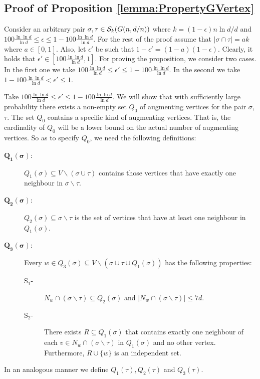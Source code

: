 \documentclass[a4paper,10pt]{article}
\begin{document}
\subsection{Proof of Proposition \ref{lemma:PropertyGVertex}}\label{sec:PropoGVertex}

Consider  an arbitrary pair $\sigma, \tau \in {\cal S}_k(G(n,d/n))$
where $k=(1-\epsilon)n\ln d/d$ and $100\frac{\ln\ln d}{\ln d}\leq \epsilon
\leq 1-100\frac{\ln\ln d}{\ln d}$.
For the rest of the proof assume that $|\sigma \cap \tau|=ak$ where
$a\in [0,1]$. Also, let $\epsilon'$ be such that $1-\epsilon'
=(1-a)(1-\epsilon)$. Clearly, it holds that $\epsilon' \in
\left[100\frac{\ln\ln d}{\ln d},1\right]$. 
For proving the proposition, we consider two cases.
In the first one we take $100\frac{\ln\ln d}{\ln d}\leq \epsilon'\leq 1-100
\frac{\ln\ln d}{\ln d}$. In the second  we take $ 1-100\frac{\ln\ln d}{\ln d}<\epsilon'\leq 1$.



Take $100\frac{\ln\ln d}{\ln d}\leq \epsilon'\leq 1-100
\frac{\ln\ln d}{\ln d}$. We will show that with sufficiently large
probability  there exists a non-empty set $Q_0$ of augmenting
vertices for the pair $\sigma$, $\tau$. The set $Q_0$ contains a
specific kind of augmenting vertices. That is, the cardinality of
$Q_0$ will be a lower bound on the actual number of augmenting
vertices. So as to specify $Q_0$, we need  the following definitions:


\begin{description}
\item[$\mathbf{Q_1(\sigma)}$:]  $Q_1(\sigma)\subseteq V \backslash (\sigma
\cup \tau)$ contains those vertices that have exactly one neighbour
in $\sigma\backslash \tau$.

\item [$\mathbf{Q_2(\sigma)}$:]  $Q_2(\sigma)\subseteq \sigma\backslash \tau$
is the  set of vertices that have at least one neighbour in $Q_1(\sigma)$.


\item [$\mathbf{Q_3(\sigma)}$:]  Every $w \in Q_3(\sigma)\subseteq V \backslash (\sigma 
\cup \tau \cup Q_1(\sigma))$ has the following properties: 
\begin{description}
	\item[S$_1$-] $N_w\cap (\sigma\backslash \tau)\subseteq Q_2(\sigma)$ and 
	$|N_w \cap (\sigma\backslash \tau) |\leq 7d$. 
	\item[S$_2$-] There exists $R\subseteq Q_1(\sigma)$ that contains exactly
	one neighbour of each $v \in N_w\cap (\sigma\backslash \tau)$ in $Q_1(\sigma)$
	and no other vertex. Furthermore, $R\cup \{w\}$ is an independent set.
\end{description}
\end{description}
In an analogous manner we define $Q_1(\tau),Q_2(\tau)$ and $Q_3(\tau)$.
\end{document}
